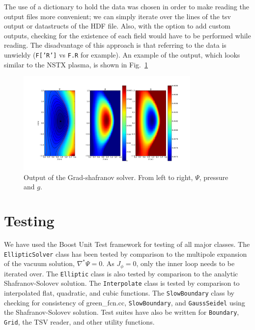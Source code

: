 \documentclass[paper=letter, fontsize=11pt]{scrartcl} %
\begin{document}
The use of a dictionary to hold the data was chosen in order to make reading the output files more convenient; we can simply iterate over the lines of the tsv output or datastructs of the HDF file. Also, with the option to add custom outputs, checking for the existence of each field would have to be performed while reading. The disadvantage of this approach is that referring to the data is unwieldy (\texttt{F['R']} vs \texttt{F.R} for example). An example of the output, which looks similar to the NSTX plasma, is shown in Fig.~\ref{fig:eqm}

\begin{figure}
	\centering
	\includegraphics[width=0.8\textwidth]{eqm}
	\caption{Output of the Grad-shafranov solver. From left to right, $\Psi$, pressure and $g$. }
	\label{fig:eqm}
\end{figure}



\section{Testing}

We have used the Boost Unit Test framework for testing of all major classes. The \texttt{EllipticSolver} class has been tested by comparison to the multipole expansion of the vacuum solution, $\nabla^* \Psi = 0$. As $J_{\phi} = 0$, only the inner loop needs to be iterated over. The \texttt{Elliptic} class is also tested by comparison to the analytic Shafranov-Solovev solution. The \texttt{Interpolate} class is tested by comparison to interpolated flat, quadratic, and cubic functions. The \texttt{SlowBoundary} class by checking for consistency of green\_fcn.cc, \texttt{SlowBoundary}, and \texttt{GaussSeidel} using the Shafranov-Solovev solution. Test suites have also be written for \texttt{Boundary}, \texttt{Grid}, the TSV reader, and other utility functions.
\end{document}
